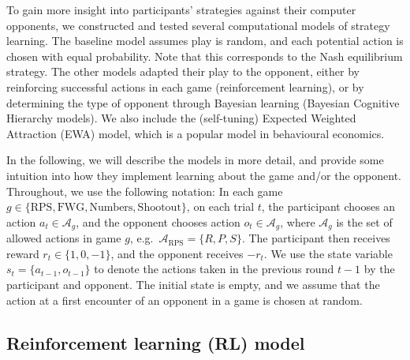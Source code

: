 \documentclass[
  english,
  man,floatsintext]{apa6}
\begin{document}
To gain more insight into participants' strategies against their computer opponents, we constructed and tested several computational models of strategy learning. The baseline model assumes play is random, and each potential action is chosen with equal probability. Note that this corresponds to the Nash equilibrium strategy. The other models adapted their play to the opponent, either by reinforcing successful actions in each game (reinforcement learning), or by determining the type of opponent through Bayesian learning (Bayesian Cognitive Hierarchy models). We also include the (self-tuning) Expected Weighted Attraction (EWA) model, which is a popular model in behavioural economics.

In the following, we will describe the models in more detail, and provide some intuition into how they implement learning about the game and/or the opponent. Throughout, we use the following notation: In each game \(g \in \{\text{RPS},\text{FWG}, \text{Numbers}, \text{Shootout} \}\), on each trial \(t\), the participant chooses an action \(a_t \in \mathcal{A}_g\), and the opponent chooses action \(o_t \in \mathcal{A}_g\), where \(\mathcal{A}_g\) is the set of allowed actions in game \(g\), e.g.~\(\mathcal{A}_\text{RPS} = \{R,P,S\}\). The participant then receives reward \(r_t \in \{1,0,-1\}\), and the opponent receives \(-r_t\). We use the state variable \(s_t = \{a_{t-1},o_{t-1}\}\) to denote the actions taken in the previous round \(t-1\) by the participant and opponent. The initial state is empty, and we assume that the action at a first encounter of an opponent in a game is chosen at random.

\hypertarget{reinforcement-learning-rl-model}{%
\subsection{Reinforcement learning (RL) model}\label{reinforcement-learning-rl-model}}
\end{document}
